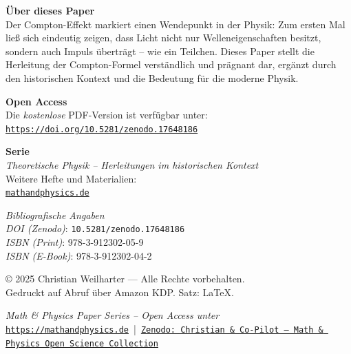 \documentclass[12pt,oneside]{scrartcl}
\newcommand{\PaperDOI}{\emph{DOI (Zenodo)}: \texttt{10.5281/zenodo.17648186}}
\newcommand{\PaperISBNPDF}{\emph{ISBN (Print)}: 978-3-912302-05-9}
\newcommand{\PaperISBNEPUB}{\emph{ISBN (E-Book)}: 978-3-912302-04-2}
\begin{document}
	\noindent
	\textbf{Über dieses Paper}\\
	Der Compton-Effekt markiert einen Wendepunkt in der Physik:
	Zum ersten Mal ließ sich eindeutig zeigen, dass Licht nicht
	nur Welleneigenschaften besitzt, sondern auch Impuls überträgt –
	wie ein Teilchen. Dieses Paper stellt die Herleitung der
	Compton-Formel verständlich und prägnant dar, ergänzt durch den
	historischen Kontext und die Bedeutung für die moderne Physik.
	
	\vspace{1.0cm}
	
	\noindent
	\textbf{Open Access}\\
	Die \emph{kostenlose} PDF-Version ist verfügbar unter:\\[2pt]
	\href{https://doi.org/10.5281/zenodo.17648186}{\texttt{https://doi.org/10.5281/zenodo.17648186}}
	
	\vspace{0.8cm}
	
	\noindent
	\textbf{Serie}\\
	\textit{Theoretische Physik – Herleitungen im historischen Kontext}\\
	Weitere Hefte und Materialien:\\
	\href{https://mathandphysics.de}{\texttt{mathandphysics.de}}
	
	\vfill
	
	\noindent
	\small
	\textit{Bibliografische Angaben}\\
	\PaperDOI\\
	\PaperISBNPDF\\
	\PaperISBNEPUB
	
	\vspace{0.8cm}
	
	\noindent
	\footnotesize
	© 2025 Christian Weilharter — Alle Rechte vorbehalten.\\
	Gedruckt auf Abruf über Amazon KDP. Satz: \LaTeX.
	
	\vfill
\begin{center}
	\textit{Math \& Physics Paper Series – Open Access unter}\\[3pt]
	\href{https://mathandphysics.de}{\texttt{https://mathandphysics.de}} 
	\,|\, 
	\href{https://zenodo.org/communities/christian-copilot/records?q=&l=list&p=1&s=10&sort=newest}{\texttt{Zenodo: Christian \& Co-Pilot – Math \& Physics Open Science Collection}}
\end{center}

	
\end{document}
